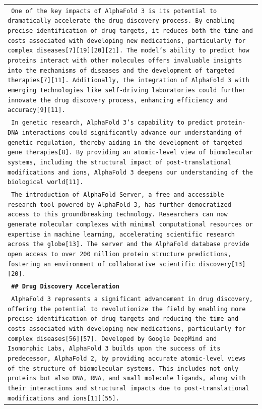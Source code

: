 \begin{longtable}{p{\textwidth}}
\texttt{\small{ One of the key impacts of AlphaFold 3 is its potential to dramatically accelerate the drug discovery process. By enabling precise identification of drug targets, it reduces both the time and costs associated with developing new medications, particularly for complex diseases[7][19][20][21]. The model's ability to predict how proteins interact with other molecules offers invaluable insights into the mechanisms of diseases and the development of targeted therapies[7][11]. Additionally, the integration of AlphaFold 3 with emerging technologies like self-driving laboratories could further innovate the drug discovery process, enhancing efficiency and accuracy[9][11]. }} \\
\texttt{\small{ In genetic research, AlphaFold 3's capability to predict protein-DNA interactions could significantly advance our understanding of genetic regulation, thereby aiding in the development of targeted gene therapies[8]. By providing an atomic-level view of biomolecular systems, including the structural impact of post-translational modifications and ions, AlphaFold 3 deepens our understanding of the biological world[11]. }} \\
\texttt{\small{ The introduction of AlphaFold Server, a free and accessible research tool powered by AlphaFold 3, has further democratized access to this groundbreaking technology. Researchers can now generate molecular complexes with minimal computational resources or expertise in machine learning, accelerating scientific research across the globe[13]. The server and the AlphaFold database provide open access to over 200 million protein structure predictions, fostering an environment of collaborative scientific discovery[13][20]. }} \\
\vspace{1pt}
\texttt{\small{\textbf{ \#\# Drug Discovery Acceleration }}} \\
\texttt{\small{ AlphaFold 3 represents a significant advancement in drug discovery, offering the potential to revolutionize the field by enabling more precise identification of drug targets and reducing the time and costs associated with developing new medications, particularly for complex diseases[56][57]. Developed by Google DeepMind and Isomorphic Labs, AlphaFold 3 builds upon the success of its predecessor, AlphaFold 2, by providing accurate atomic-level views of the structure of biomolecular systems. This includes not only proteins but also DNA, RNA, and small molecule ligands, along with their interactions and structural impacts due to post-translational modifications and ions[11][55]. }} \\

\end{longtable}
